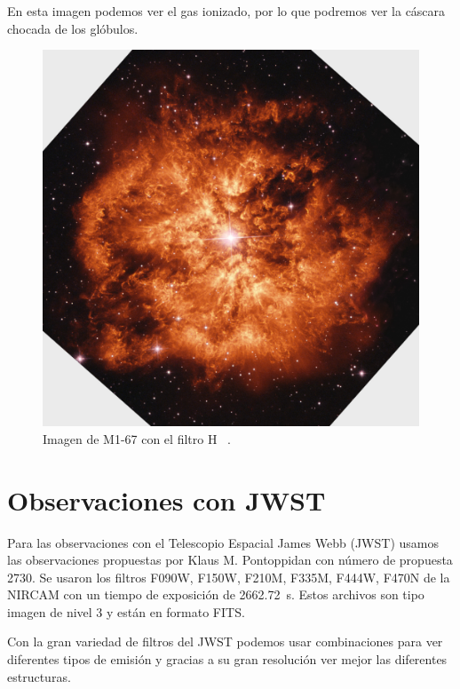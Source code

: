 \documentclass{book}
\begin{document}
En esta imagen podemos ver el gas ionizado, por lo que podremos ver la cáscara chocada de los glóbulos.

\begin{figure}[htb]
    \centering
    \includegraphics[width=\textwidth]{m1-67-comp-full-hst.jpg}
    \caption{Imagen de M1-67 con el filtro \unit{H\alpha} .}
    \label{fig:M1-67HST}
\end{figure}

\section{Observaciones con JWST}

Para las observaciones con el Telescopio Espacial James Webb (JWST) usamos las observaciones propuestas por Klaus M. Pontoppidan con número de propuesta 2730. Se usaron los filtros F090W, F150W, F210M, F335M, F444W, F470N de la NIRCAM con un tiempo de exposición de \SI{2662.72}{s}. Estos archivos son tipo imagen de nivel 3 y están en formato FITS.

Con la gran variedad de filtros del JWST podemos usar combinaciones para ver diferentes tipos de emisión y gracias a su gran resolución ver mejor las diferentes estructuras.
\end{document}

